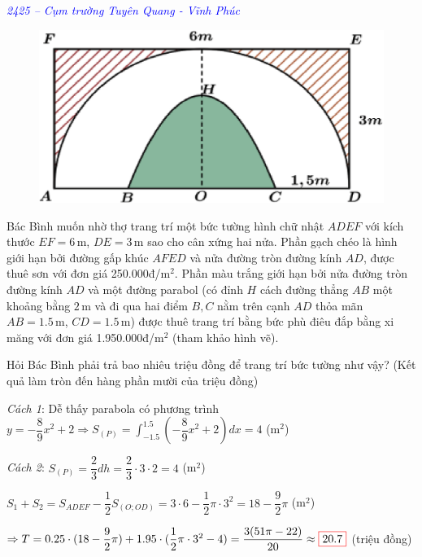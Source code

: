 \documentclass[twoside,final]{hcmut-report}
\newcommand{\exercise}[1]{\begin{exercisebox}#1\end{exercisebox}}
\newcommand{\result}[1]{\fcolorbox{red}{white}{#1}}
\begin{document}
\exercise{
    \textcolor{blue}{\textit{2425 -- Cụm trường Tuyên Quang - Vĩnh Phúc}}

    \begin{figure}
        \centering
        \includegraphics*[width=1.03\linewidth]{images/XSTK/TQ-VP-2.png}
    \end{figure}

    Bác Bình muốn nhờ thợ trang trí một bức tường hình chữ nhật $ADEF$ với kích thước $EF = 6\,\text{m}$, $DE = 3\,\text{m}$ sao cho cân xứng hai nửa. Phần gạch chéo là hình giới hạn bởi đường gấp khúc $AFED$ và nửa đường tròn đường kính $AD$, được thuê sơn với đơn giá 250.000đ/m$^2$. Phần màu trắng giới hạn bởi nửa đường tròn đường kính $AD$ và một đường parabol (có đỉnh $H$ cách đường thẳng $AB$ một khoảng bằng $2\,\text{m}$ và đi qua hai điểm $B, C$ nằm trên cạnh $AD$ thỏa mãn $AB = 1.5\,\text{m}$, $CD = 1.5\,\text{m}$) được thuê trang trí bằng bức phù điêu đắp bằng xi măng với đơn giá 1.950.000đ/m$^2$ (tham khảo hình vẽ).

    Hỏi Bác Bình phải trả bao nhiêu triệu đồng để trang trí bức tường như vậy? (Kết quả làm tròn đến hàng phần mười của triệu đồng)
}
\textit{Cách 1}: Dễ thấy parabola có phương trình $y = -\dfrac{8}{9}x^2 + 2 \Rightarrow S_{(P)} = \displaystyle \int_{-1.5}^{1.5}(-\dfrac{8}{9}x^2 + 2)dx = 4$ (m$^2$)\par
\textit{Cách 2}: $S_{(P)} = \dfrac{2}{3}dh = \dfrac{2}{3}\cdot 3\cdot 2 = 4$ (m$^2$)\par
$S_1 + S_2 = S_{ADEF} - \dfrac{1}{2}S_{(O; OD)} = 3\cdot 6 - \dfrac{1}{2}\pi\cdot 3^2 = 18 - \dfrac{9}{2}\pi$ (m$^2$)\par
$\Rightarrow T = 0.25\cdot(18 - \dfrac{9}{2}\pi) + 1.95\cdot (\dfrac{1}{2}\pi\cdot 3^2 - 4) = \dfrac{3(51\pi-22)}{20} \approx \result{20.7}$ (triệu đồng)
\end{document}

